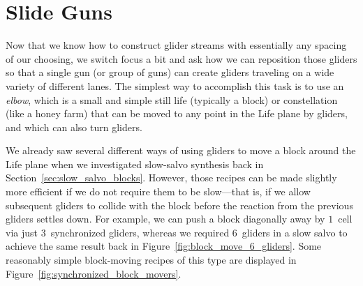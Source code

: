 \section{Slide Guns}\label{sec:slide_guns}

Now that we know how to construct glider streams with essentially any spacing of our choosing, we switch focus a bit and ask how we can reposition those gliders so that a single gun (or group of guns) can create gliders traveling on a wide variety of different lanes. The simplest way to accomplish this task is to use an \emph{elbow}, which is a small and simple still life (typically a block) or constellation (like a honey farm) that can be moved to any point in the Life plane by gliders, and which can also turn gliders.

We already saw several different ways of using gliders to move a block around the Life plane when we investigated slow-salvo synthesis back in Section~\ref{sec:slow_salvo_blocks}. However, those recipes can be made slightly more efficient if we do not require them to be slow---that is, if we allow subsequent gliders to collide with the block before the reaction from the previous gliders settles down. For example, we can push a block diagonally away by $1$~cell via just $3$~synchronized gliders, whereas we required $6$~gliders in a slow salvo to achieve the same result back in Figure~\ref{fig:block_move_6_gliders}. Some reasonably simple block-moving recipes of this type are displayed in Figure~\ref{fig:synchronized_block_movers}.

